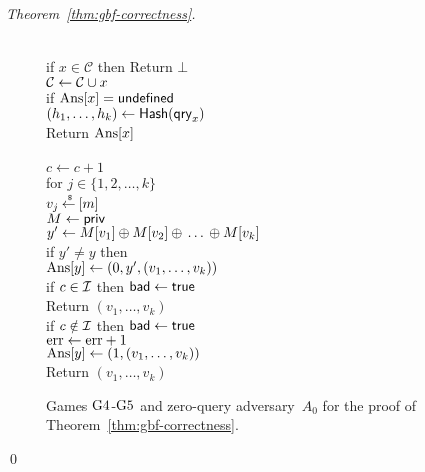 \begin{proof}[Theorem~\ref{thm:gbf-correctness}]
\begin{figure}[tp]
{{\\
if $x \in \mathcal{C}$ then Return $\bot$\\
${\cal C} \gets {\cal C} \cup x$\\
if $\mathrm{Ans}[x] = \mathsf{undefined}$\\
\nudge $(h_1, \ldots, h_{k}) \gets \mathsf{Hash}(\mathsf{qry}_x)$\\
Return $\mathrm{Ans}[x]$\\
}
{
\\
$c \gets c + 1$\\
for $j \in \{1,2,\ldots,k\}$\\
\nudge $v_j {\:\stackrel{{\scriptscriptstyle \hspace{0.2em}\$}} {\leftarrow}\:} [m]$\\
%
$M \gets{\sf priv}$\\
$y' \gets M[v_1] {\:\oplus\:} M[v_2] {\:\oplus\:} \ldots {\:\oplus\:} M[v_k]$\\
if $y' \neq y$ then \\
\nudge $\mathrm{Ans}[y] \gets (0,y', (v_1, \ldots, v_{k}) )$\\
\nudge if $c \in {\cal I}$ then $\mathsf{bad} \gets \mathsf{true}$\\
\nudge Return $\left(v_1,\ldots,v_k\right)$\\
if $c \notin {\cal I}$ then $\mathsf{bad} \gets \mathsf{true}$\\
$\mathrm{err} \gets \mathrm{err} +1$\\
$\mathrm{Ans}[y] \gets (1, (v_1, \ldots, v_{k}))$\\
Return $\left(v_1,\ldots,v_k\right)$
}
}
\caption{Games $\text{G4}$-$\text{G5}$ and zero-query adversary~$A_0$ for the
proof of Theorem~\ref{thm:gbf-correctness}.}
\label{fig:gbf-correctness-games2}
\end{figure}
\hfill\qed
\end{proof}
